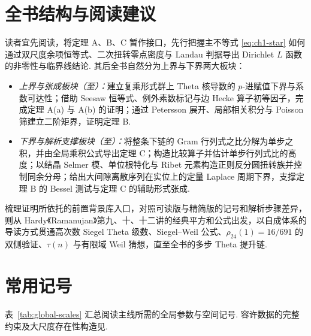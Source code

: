 \section*{全书结构与阅读建议}

读者宜先阅读，将定理 A、B、C 暂作接口，先行把握主不等式 \eqref{eq:ch1-star} 如何通过双尺度余项恒等式、二次扭转零点密度与 Landau 判据导出 Dirichlet $L$ 函数的非零性与临界线结论. 其后全书自然分为上界与下界两大板块：
\begin{itemize}
\item \emph{上界与张成板块（至）：}建立复乘形式群上 Theta 核导数的 $p$-进赋值下界与系数可达性；借助 Seesaw 恒等式、例外素数标记与边 Hecke 算子初等因子，完成定理 A(a) 与 A(b) 的证明；通过 Petersson 展开、局部相关积分与 Poisson 筛建立二阶矩界，证明定理 B.
\item \emph{下界与解析支撑板块（至）：}将整条下链的 Gram 行列式之比分解为单步之积，并由全局乘积公式导出定理 C；构造比较算子并估计单步行列式比的高度；以结晶 Selmer 模、单位根特化与 Ribet 元素构造正则反分圆扭转族并控制同余分母；给出大间隙离散序列在实位上的定量 Laplace 周期下界，支撑定理 B 的 Bessel 测试与定理 C 的辅助形式张成.
\end{itemize}
梳理证明所依托的前置背景库入口，对照可读版与精简版的记号和解析步骤差异，则从 Hardy《Ramanujan》第九、十、十二讲的经典平方和公式出发，以自成体系的导读方式贯通高次数 Siegel Theta 级数、Siegel--Weil 公式、$\rho_{24}(1)=16/691$ 的双侧验证、$\tau(n)$ 与有限域 Weil 猜想，直至全书的多步 Theta 提升链.

\section*{常用记号}

表~\ref{tab:global-scales} 汇总阅读主线所需的全局参数与空间记号. 容许数据的完整约束及大尺度存在性构造见.

